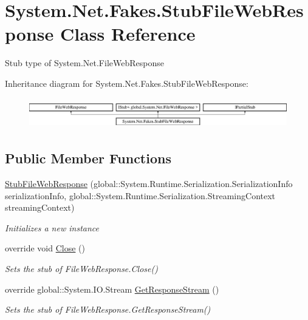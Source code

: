 \hypertarget{class_system_1_1_net_1_1_fakes_1_1_stub_file_web_response}{\section{System.\-Net.\-Fakes.\-Stub\-File\-Web\-Response Class Reference}
\label{class_system_1_1_net_1_1_fakes_1_1_stub_file_web_response}
}


Stub type of System.\-Net.\-File\-Web\-Response 


Inheritance diagram for System.\-Net.\-Fakes.\-Stub\-File\-Web\-Response\-:\begin{figure}[H]
\begin{center}
\leavevmode
\includegraphics[height=1.342926cm]{class_system_1_1_net_1_1_fakes_1_1_stub_file_web_response}
\end{center}
\end{figure}
\subsection*{Public Member Functions}
\begin{DoxyCompactItemize}
\item 
\hyperlink{class_system_1_1_net_1_1_fakes_1_1_stub_file_web_response_a852ab99380429db4b21acbb8f73c6b5a}{Stub\-File\-Web\-Response} (global\-::\-System.\-Runtime.\-Serialization.\-Serialization\-Info serialization\-Info, global\-::\-System.\-Runtime.\-Serialization.\-Streaming\-Context streaming\-Context)
\begin{DoxyCompactList}\small\item\em Initializes a new instance\end{DoxyCompactList}\item 
override void \hyperlink{class_system_1_1_net_1_1_fakes_1_1_stub_file_web_response_affa9c59d2a9645cce3ccd1a64894e10f}{Close} ()
\begin{DoxyCompactList}\small\item\em Sets the stub of File\-Web\-Response.\-Close()\end{DoxyCompactList}\item 
override global\-::\-System.\-I\-O.\-Stream \hyperlink{class_system_1_1_net_1_1_fakes_1_1_stub_file_web_response_aa2467042fc0d326e316868674b286c72}{Get\-Response\-Stream} ()
\begin{DoxyCompactList}\small\item\em Sets the stub of File\-Web\-Response.\-Get\-Response\-Stream()\end{DoxyCompactList}\end{DoxyCompactItemize}
